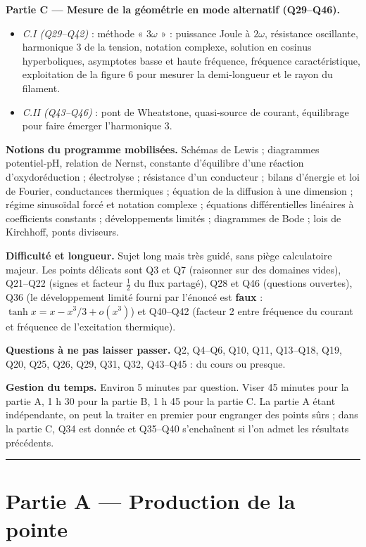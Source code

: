 \documentclass[11pt,a4paper]{article}
\providecommand{\tightlist}{\setlength{\itemsep}{0pt}\setlength{\parskip}{0pt}}
\begin{document}
\textbf{Partie C --- Mesure de la géométrie en mode alternatif (Q29--Q46).}

\begin{itemize}
\tightlist
\item
  \emph{C.I (Q29--Q42)} : méthode « \(3\omega\) » : puissance Joule à \(2\omega\), résistance oscillante, harmonique 3 de la tension, notation complexe, solution en cosinus hyperboliques, asymptotes basse et haute fréquence, fréquence caractéristique, exploitation de la figure 6 pour mesurer la demi-longueur et le rayon du filament.
\item
  \emph{C.II (Q43--Q46)} : pont de Wheatstone, quasi-source de courant, équilibrage pour faire émerger l'harmonique 3.
\end{itemize}

\textbf{Notions du programme mobilisées.} Schémas de Lewis ; diagrammes potentiel-pH, relation de Nernst, constante d'équilibre d'une réaction d'oxydoréduction ; électrolyse ; résistance d'un conducteur ; bilans d'énergie et loi de Fourier, conductances thermiques ; équation de la diffusion à une dimension ; régime sinusoïdal forcé et notation complexe ; équations différentielles linéaires à coefficients constants ; développements limités ; diagrammes de Bode ; lois de Kirchhoff, ponts diviseurs.

\textbf{Difficulté et longueur.} Sujet long mais très guidé, sans piège calculatoire majeur. Les points délicats sont Q3 et Q7 (raisonner sur des domaines vides), Q21--Q22 (signes et facteur \(\frac12\) du flux partagé), Q28 et Q46 (questions ouvertes), Q36 (le développement limité fourni par l'énoncé est \textbf{faux} : \(\tanh x=x-x^3/3+o(x^3)\)) et Q40--Q42 (facteur 2 entre fréquence du courant et fréquence de l'excitation thermique).

\textbf{Questions à ne pas laisser passer.} Q2, Q4--Q6, Q10, Q11, Q13--Q18, Q19, Q20, Q25, Q26, Q29, Q31, Q32, Q43--Q45 : du cours ou presque.

\textbf{Gestion du temps.} Environ 5 minutes par question. Viser 45 minutes pour la partie A, 1 h 30 pour la partie B, 1 h 45 pour la partie C. La partie A étant indépendante, on peut la traiter en premier pour engranger des points sûrs ; dans la partie C, Q34 est donnée et Q35--Q40 s'enchaînent si l'on admet les résultats précédents.

\begin{center}\rule{0.5\linewidth}{0.5pt}\end{center}

\hypertarget{partie-a-production-de-la-pointe}{%
\section{Partie A --- Production de la pointe}\label{partie-a-production-de-la-pointe}}
\end{document}
